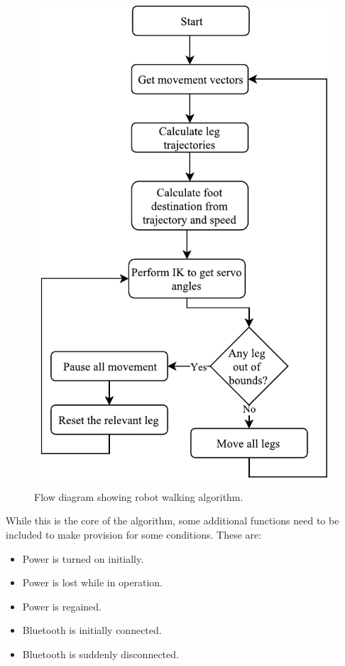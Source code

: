 \begin{figure}[H]
\centering
\includegraphics[scale = 1]{pics/Soft1.pdf}
\caption{Flow diagram showing robot walking algorithm.}
\label{fig:Soft1}
\end{figure}

While this is the core of the algorithm, some additional functions need to be included to make provision for some conditions. These are:
\begin{itemize}
\item Power is turned on initially.
\item Power is lost while in operation.
\item Power is regained.
\item Bluetooth is initially connected.
\item Bluetooth is suddenly disconnected.
\end{itemize}

